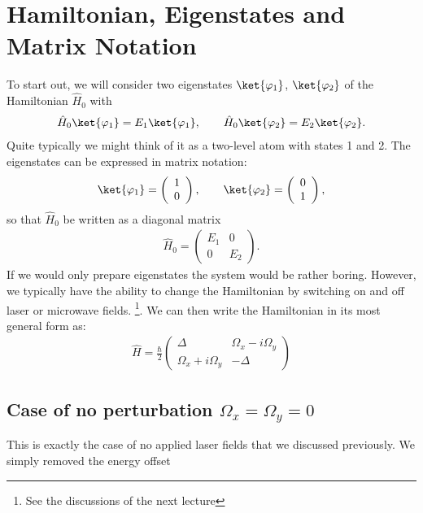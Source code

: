 \section{Hamiltonian, Eigenstates and Matrix Notation}

To start out, we will consider two eigenstates $\ket{\varphi_1}$, $\ket{\varphi_2}$ of the Hamiltonian $\hat{H}_0$ with
\begin{align}
 \hat{H}_0\ket{\varphi_1}=E_1\ket{\varphi_1}, \qquad \hat{H}_0\ket{\varphi_2}=E_2\ket{\varphi_2}.
\end{align}
Quite typically we might think of it as a two-level atom with states 1 and 2. The eigenstates can be expressed in matrix notation:
\begin{align}
 \ket{\varphi_1}=\left( \begin{array}{c} 1 \\ 0 \end{array} \right), \qquad \ket{\varphi_2}=\left( \begin{array}{c} 0 \\ 1 \end{array} \right),
\end{align}
so that $\hat{H}_0$ be written as a diagonal matrix
\begin{align}
    \hat{H}_0 = \left(\begin{array}{cc} E_1 & 0 \\ 0 & E_2 \end{array}\right).
\end{align}
If we would only prepare eigenstates the system would be rather boring. However, we typically have the ability to change the Hamiltonian by switching on and off laser or microwave fields. \footnote{See the discussions of the next lecture}. We can then write the Hamiltonian in its most general form as:
\begin{align}
\hat{H} = \frac{\hbar}{2}\left( \begin{array}{cc} \Delta  & \Omega_x - i\Omega_y\\ \Omega_x +i\Omega_y & -\Delta \end{array} \right)
\end{align}

\subsection{Case of no perturbation $\Omega_x = \Omega_y = 0$}

This is exactly the case of no applied laser fields that we discussed previously. We simply removed the energy offset 




